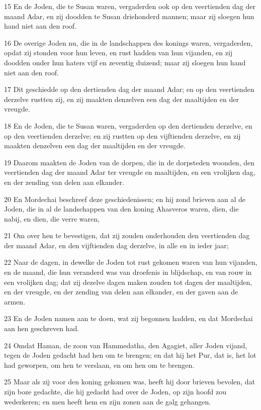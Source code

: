 \par 15 En de Joden, die te Susan waren, vergaderden ook op den veertienden dag der maand Adar, en zij doodden te Susan driehonderd mannen; maar zij sloegen hun hand niet aan den roof.
\par 16 De overige Joden nu, die in de landschappen des konings waren, vergaderden, opdat zij stonden voor hun leven, en rust hadden van hun vijanden, en zij doodden onder hun haters vijf en zeventig duizend; maar zij sloegen hun hand niet aan den roof.
\par 17 Dit geschiedde op den dertienden dag der maand Adar; en op den veertienden derzelve rustten zij, en zij maakten denzelven een dag der maaltijden en der vreugde.
\par 18 En de Joden, die te Susan waren, vergaderden op den dertienden derzelve, en op den veertienden derzelve; en zij rustten op den vijftienden derzelve, en zij maakten denzelven een dag der maaltijden en der vreugde.
\par 19 Daarom maakten de Joden van de dorpen, die in de dorpsteden woonden, den veertienden dag der maand Adar ter vreugde en maaltijden, en een vrolijken dag, en der zending van delen aan elkander.
\par 20 En Mordechai beschreef deze geschiedenissen; en hij zond brieven aan al de Joden, die in al de landschappen van den koning Ahasveros waren, dien, die nabij, en dien, die verre waren,
\par 21 Om over hen te bevestigen, dat zij zouden onderhouden den veertienden dag der maand Adar, en den vijftienden dag derzelve, in alle en in ieder jaar;
\par 22 Naar de dagen, in dewelke de Joden tot rust gekomen waren van hun vijanden, en de maand, die hun veranderd was van droefenis in blijdschap, en van rouw in een vrolijken dag; dat zij dezelve dagen maken zouden tot dagen der maaltijden, en der vreugde, en der zending van delen aan elkander, en der gaven aan de armen.
\par 23 En de Joden namen aan te doen, wat zij begonnen hadden, en dat Mordechai aan hen geschreven had.
\par 24 Omdat Haman, de zoon van Hammedatha, den Agagiet, aller Joden vijand, tegen de Joden gedacht had hen om te brengen; en dat hij het Pur, dat is, het lot had geworpen, om hen te verslaan, en om hen om te brengen.
\par 25 Maar als zij voor den koning gekomen was, heeft hij door brieven bevolen, dat zijn boze gedachte, die hij gedacht had over de Joden, op zijn hoofd zou wederkeren; en men heeft hem en zijn zonen aan de galg gehangen.
